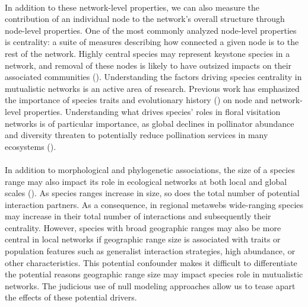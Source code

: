 \documentclass[12pt]{article}
\begin{document}
\paragraph*{}
In addition to these network-level properties, we can also measure the contribution of an individual node to the network's overall structure through node-level properties. One of the most commonly analyzed node-level properties is centrality: a suite of measures describing how connected a given node is to the rest of the network. Highly central species may represent keystone species in a network, and removal of these nodes is likely to have outsized impacts on their associated communities (\cite{traveset2017plant, maia2019plant, martins2024propagation}). Understanding the factors driving species centrality in mutualistic networks is an active area of research. Previous work has emphasized the importance of species traits\cite{watts2016influence, lazaro2020linking, maia2019plant} and evolutionary history (\cite{Gonzales2015macroecology, burin2021macroevolutionary}) on node and network-level properties. Understanding what drives species' roles in floral visitation networks is of particular importance, as global declines in pollinator abundance and diversity threaten to potentially reduce pollination services in many ecosystems (\cite{potts2010global, rodger2021widespread}). 



\paragraph*{}
In addition to morphological and phylogenetic associations, the size of a species range may also impact its role in ecological networks at both local and global scales (\cite{moulatlet2023species, dattilo2020species}). As species ranges increase in size, so does the total number of potential interaction partners. As a consequence, in regional metawebs wide-ranging species may increase in their total number of interactions and subsequently their centrality. However, species with broad geographic ranges may also be more central in local networks if geographic range size is associated with traits or population features such as generalist interaction strategies, high abundance, or other characteristics. This potential confounder makes it difficult to differentiate the potential reasons geographic range size may impact species role in mutualistic networks. The judicious use of null modeling approaches allow us to tease apart the effects of these potential drivers. 
\end{document}
